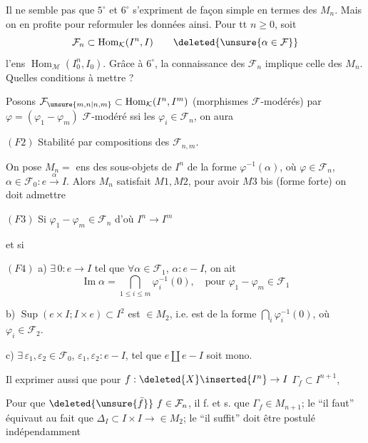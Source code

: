 Il ne semble pas que $5^\circ$ et $6^\circ$ s'expriment de façon simple en termes des $M_n$. Mais on en profite pour reformuler les données ainsi. Pour tt $n\geq0$, soit
\[
\mathcal F_n\subset\operatorname{Hom}_{\mathcal K}(I^n,I)\qquad\deleted{\unsure{\alpha\in\mathcal F}}
\]
l'ens $\operatorname{Hom}_{\mathcal M}(I_0^n,I_0)$. Grâce à $6^\circ$, la connaissance des $\mathcal F_n$ implique celle des $M_n$. Quelles conditions à mettre ?

 Posons $\mathcal F_{\unsure{m,n|n,m}}\subset\operatorname{Hom}_{\mathcal K}(I^n,I^m)$  (morphismes $\mathcal F$-modérés) par $\varphi=(\varphi_1-\varphi_m)$ $\mathcal F$-modéré ssi les $\varphi_i\in\mathcal F_n$, on  aura


 $(F2)$ Stabilité par compositions des $\mathcal F_{n,m}$.

On pose $M_n=$ ens des sous-objets de $I^n$  de la forme $\varphi^{-1}(\alpha)$, où $\varphi\in\mathcal F_n$, $\alpha\in\mathcal F_0:e\xrightarrow{\alpha}I$.
Alors $M_n$ satisfait $M1,M2$, pour avoir $M3$ bis (forme forte) on doit admettre

$(F3)$ Si $\varphi_1-\varphi_m\in\mathcal F_n$ d'où $I^n\longrightarrow I^m$

et si \unsure{---}

$(F4)$ a) $\exists\,0:e\longrightarrow I$  tel que $\forall\alpha\in\mathcal F_1$, $\alpha:e-I$, on ait
\[
\operatorname{Im}\alpha=\bigcap_{1\leq i\leq m}\varphi_i^{-1}(0),\quad
\text{pour }\varphi_1-\varphi_m\in\mathcal F_1
\]

b) $\operatorname{Sup}(e\times I;I\times e)\subset I^2$ est $\in M_2$, i.e. est de la forme $\bigcap_i\varphi_i^{-1}(0)$, où $\varphi_i\in\mathcal F_2$.

c) $\exists\,\varepsilon_1,\varepsilon_2\in\mathcal F_0$, $\varepsilon_1,\varepsilon_2:e-I$, tel que $e\amalg e-I$ soit mono.

Il  exprimer aussi que pour  $f:\deleted{X}\inserted{I^n}\to I$    $\Gamma_f\subset I^{n+1}$,

Pour que $\deleted{\unsure{\bar f}}\ f\in\mathcal F_n$, il f. et s. que $\Gamma_f\in M_{n+1}$;
le ``il faut'' équivaut au fait que $\Delta_I\subset I\times I\longrightarrow{}\in M_2$; le ``il suffit'' doit être postulé indépendamment

